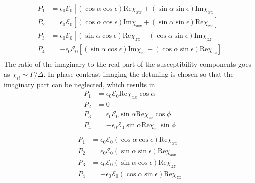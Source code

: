 \documentclass[11pt,letter]{article}
\newcommand{\efieldo}{\ensuremath{\mathcal{E}_{0}}}
\begin{document}
\begin{equation}
\begin{split}
  P_{1} &= \epsilon_{0} \efieldo[
            ( \cos\alpha\cos\epsilon ) \text{Re}\chi_{xx}
          + ( \sin\alpha\sin\epsilon ) \text{Im}\chi_{xx} ]\\ 
  P_{2} &= \epsilon_{0} \efieldo[
            ( \cos\alpha\cos\epsilon ) \text{Im}\chi_{xx} 
          + ( \sin\alpha\sin\epsilon ) \text{Re}\chi_{xx} ]\\ 
  P_{3} &= \epsilon_{0} \efieldo[
            ( \sin\alpha\cos\epsilon ) \text{Re}\chi_{zz}
          - ( \cos\alpha\sin\epsilon ) \text{Im}\chi_{zz} ]\\
  P_{4} &= -\epsilon_{0} \efieldo[
            ( \sin\alpha\cos\epsilon ) \text{Im}\chi_{zz} 
          + ( \cos\alpha\sin\epsilon ) \text{Re}\chi_{zz} ]\\ 
\end{split}
\end{equation}
The ratio of the imaginary to the real part of the susceptibility components
goes as $\chi_{ii} \sim \Gamma / \Delta$.  In phase-contrast imaging the
detuning is chosen so that the imaginary part  can be neglected, which results
in
\begin{equation}
\begin{split}
  P_{1} &= \epsilon_{0} \efieldo \text{Re}\chi_{xx} \cos\alpha \\
  P_{2} &= 0\\ 
  P_{3} &= \epsilon_{0} \efieldo \sin\alpha 
            \text{Re}\chi_{zz} \cos\phi \\ 
  P_{4} &= -\epsilon_{0} \efieldo \sin\alpha
           \text{Re}\chi_{zz} \sin\phi  \\ 
\end{split}
\end{equation}
\begin{equation}
\begin{split}
  P_{1} &= \epsilon_{0} \efieldo
            ( \cos\alpha\cos\epsilon ) \text{Re}\chi_{xx} \\
  P_{2} &= \epsilon_{0} \efieldo
           ( \sin\alpha\sin\epsilon ) \text{Re}\chi_{xx} \\ 
  P_{3} &= \epsilon_{0} \efieldo
            ( \sin\alpha\cos\epsilon ) \text{Re}\chi_{zz} \\
  P_{4} &= -\epsilon_{0} \efieldo
           ( \cos\alpha\sin\epsilon ) \text{Re}\chi_{zz} \\ 
\end{split}
\end{equation}
    
\end{document}

